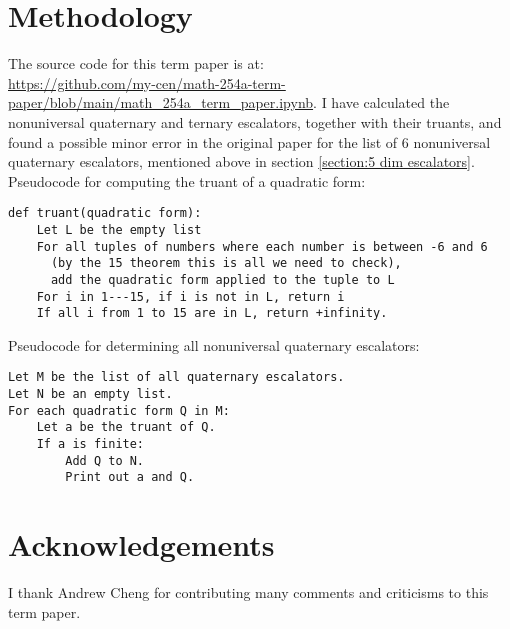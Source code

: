 \documentclass[letterpaper, 12pt]{article}
\begin{document}
\section{Methodology}
The source code for this term paper is at:\\\url{https://github.com/my-cen/math-254a-term-paper/blob/main/math_254a_term_paper.ipynb}.
I have calculated the nonuniversal quaternary and ternary escalators, together with their truants, and found a possible minor error in the original paper for the list of $6$ nonuniversal quaternary escalators, mentioned above in section \ref{section:5 dim escalators}. Pseudocode for computing the truant of a quadratic form:
\begin{verbatim}
def truant(quadratic form):
    Let L be the empty list
    For all tuples of numbers where each number is between -6 and 6
      (by the 15 theorem this is all we need to check),
      add the quadratic form applied to the tuple to L
    For i in 1---15, if i is not in L, return i
    If all i from 1 to 15 are in L, return +infinity.
\end{verbatim}

Pseudocode for determining all nonuniversal quaternary escalators:
\begin{verbatim}
Let M be the list of all quaternary escalators.
Let N be an empty list.
For each quadratic form Q in M:
    Let a be the truant of Q.
    If a is finite:
        Add Q to N.
        Print out a and Q.
\end{verbatim}

\section{Acknowledgements}
I thank Andrew Cheng for contributing many comments and criticisms to this term paper.

\printbibliography
\end{document}

